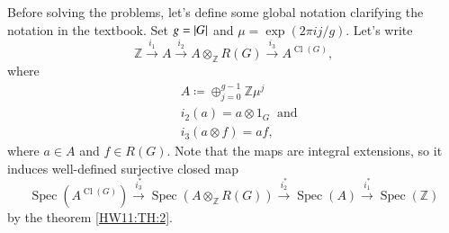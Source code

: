 \documentclass[a4paper, 12pt]{article}
\theoremstyle{Mydefinition}
\theoremstyle{Mytheorem}
\DeclareMathOperator{\cl}{Cl}
\DeclareMathOperator{\Spec}{Spec}
\begin{document}
Before solving the problems, let's define some global notation clarifying the notation in the textbook. Set $g=\abs{G}$ and $\mu = \exp(2\pi ij/g)$. Let's write 
\begin{equation}\label{HW11:Eq:1}
    \mathbb{Z}\xrightarrow{i_1} A\xrightarrow{i_2}A\otimes_{\mathbb{Z}} R(G)\xrightarrow{i_3}A^{\cl(G)},
\end{equation}
where
\begin{equation}
\begin{split}
    &A \coloneqq \oplus_{j=0}^{g-1} \mathbb{Z}\mu^j\\
    &i_2(a) = a\otimes 1_G~\textrm{ and}\\
    &i_3(a\otimes f) = af,
\end{split}
\end{equation}
where $a\in A$ and $f\in R(G)$. Note that the maps are integral extensions, so it induces well-defined surjective closed map
\begin{equation}
    \Spec(A^{\cl(G)})\xrightarrow{i^*_3}\Spec(A\otimes_{\mathbb{Z}} R(G))\xrightarrow{i^*_2}\Spec(A)\xrightarrow{i_1^*}\Spec(\mathbb{Z})
\end{equation}
by the theorem \ref{HW11:TH:2}.
\end{document}
